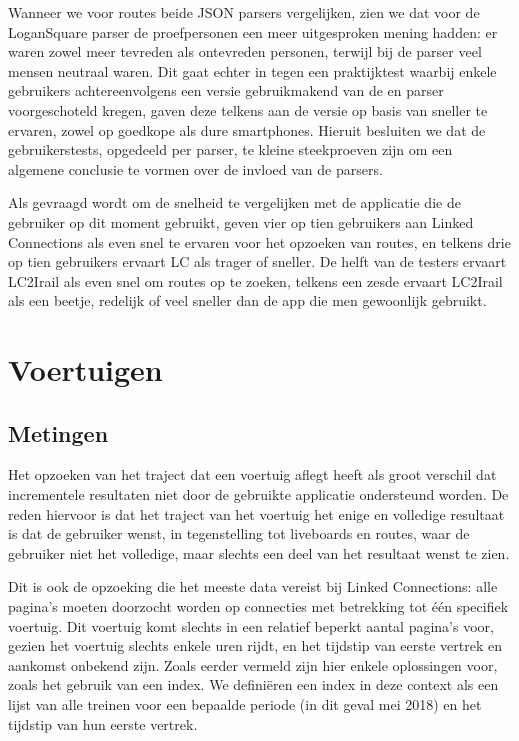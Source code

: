 Wanneer we voor routes beide JSON parsers vergelijken, zien we dat voor de LoganSquare parser de proefpersonen een meer uitgesproken mening hadden: er waren zowel meer tevreden als ontevreden personen, terwijl bij de  parser veel mensen neutraal waren. Dit gaat echter in tegen een praktijktest waarbij enkele gebruikers achtereenvolgens een versie gebruikmakend van de  en  parser voorgeschoteld kregen, gaven deze telkens aan de versie op basis van  sneller te ervaren, zowel op goedkope als dure smartphones. Hieruit besluiten we dat de gebruikerstests, opgedeeld per parser, te kleine steekproeven zijn om een algemene conclusie te vormen over de invloed van de parsers.

Als gevraagd wordt om de snelheid te vergelijken met de applicatie die de gebruiker op dit moment gebruikt, geven vier op tien gebruikers aan Linked Connections als even snel te ervaren voor het opzoeken van routes, en telkens drie op tien gebruikers ervaart LC als trager of sneller. De helft van de testers ervaart LC2Irail als even snel om routes op te zoeken, telkens een zesde ervaart LC2Irail als een beetje, redelijk of veel sneller dan de app die men gewoonlijk gebruikt.

\section{Voertuigen}

\subsection{Metingen}
Het opzoeken van het traject dat een voertuig aflegt heeft als groot verschil dat incrementele resultaten niet door de gebruikte applicatie ondersteund worden. De reden hiervoor is dat het traject van het voertuig het enige en volledige resultaat is dat de gebruiker wenst, in tegenstelling tot liveboards en routes, waar de gebruiker niet het volledige, maar slechts een deel van het resultaat wenst te zien. 

Dit is ook de opzoeking die het meeste data vereist bij Linked Connections: alle pagina's moeten doorzocht worden op connecties met betrekking tot één specifiek voertuig. Dit voertuig komt slechts in een relatief beperkt aantal pagina's voor, gezien het voertuig slechts enkele uren rijdt, en het tijdstip van eerste vertrek en aankomst onbekend zijn. Zoals eerder vermeld %
zijn hier enkele oplossingen voor, zoals het gebruik van een index. We definiëren een index in deze context als een lijst van alle treinen voor een bepaalde periode (in dit geval mei 2018) en het tijdstip van hun eerste vertrek.

